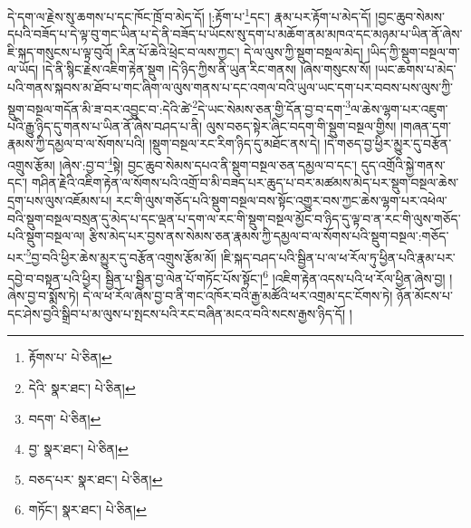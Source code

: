 དེ་དག་ལ་རྗེས་སུ་ཆགས་པ་དང་ཁོང་ཁྲོ་བ་མེད་དོ། །:རྟོག་པ་\footnote{རྟོགས་པ་  པེ་ཅིན། }དང་། རྣམ་པར་རྟོག་པ་མེད་དོ། །བྱང་ཆུབ་སེམས་དཔའི་བཟོད་པ་དེ་ལྟ་བུ་གང་ཡིན་པ་དེ་ནི་བཟོད་པ་ཡོངས་སུ་དག་པ་མཆོག་ནམ་མཁའ་དང་མཉམ་པ་ཡིན་ནོ་ཞེས་ཇི་སྐད་གསུངས་པ་ལྟ་བུའོ། །རིན་པོ་ཆེའི་ཕྲེང་བ་ལས་ཀྱང་། དེ་ལ་ལུས་ཀྱི་སྡུག་བསྔལ་མེད། །ཡིད་ཀྱི་སྡུག་བསྔལ་ག་ལ་ཡོད། །དེ་ནི་སྙིང་རྗེས་འཇིག་རྟེན་སྡུག །དེ་ཉིད་ཀྱིས་ནི་ཡུན་རིང་གནས། །ཞེས་གསུངས་སོ། །ཡང་ཆགས་པ་མེད་པའི་གནས་སྐབས་མ་ཐོབ་པ་གང་ཞིག་ལ་ལུས་གནས་པ་དང་འགལ་བའི་ཡུལ་ཡང་དག་པར་བབས་པས་ལུས་ཀྱི་སྡུག་བསྔལ་གདོན་མི་ཟ་བར་འབྱུང་བ་:དེའི་ཚེ་\footnote{དེའི་  སྣར་ཐང་།  པེ་ཅིན། }དེ་ཡང་སེམས་ཅན་གྱི་དོན་བྱ་བ་དག་\footnote{བདག་  པེ་ཅིན། }ལ་ཆེས་ལྷག་པར་འཇུག་པའི་རྒྱུ་ཉིད་དུ་གནས་པ་ཡིན་ནོ་ཞེས་བཤད་པ་ནི། ལུས་བཅད་སྟེར་ཞིང་བདག་གི་སྡུག་བསྔལ་གྱིས། །གཞན་དག་རྣམས་ཀྱི་དམྱལ་བ་ལ་སོགས་པའི། །སྡུག་བསྔལ་རང་རིག་ཉིད་དུ་མཐོང་ནས་དེ། །དེ་གཅད་བྱ་ཕྱིར་མྱུར་དུ་བརྩོན་འགྲུས་རྩོམ། །ཞེས་:བྱ་བ་\footnote{བྱ་  སྣར་ཐང་།  པེ་ཅིན། }སྟེ། བྱང་ཆུབ་སེམས་དཔའ་ནི་སྡུག་བསྔལ་ཅན་དམྱལ་བ་དང་། དུད་འགྲོའི་སྐྱེ་གནས་དང་། གཤིན་རྗེའི་འཇིག་རྟེན་ལ་སོགས་པའི་འགྲོ་བ་མི་བཟད་པར་ཆུད་པ་བར་མཚམས་མེད་པར་སྡུག་བསྔལ་ཆེས་དྲག་པས་ལུས་འཇོམས་པ། རང་གི་ལུས་གཅོད་པའི་སྡུག་བསྔལ་བས་སྟོང་འགྱུར་བས་ཀྱང་ཆེས་ལྷག་པར་འཕེལ་བའི་སྡུག་བསྔལ་བསྲན་དུ་མེད་པ་དང་ལྡན་པ་དག་ལ་རང་གི་སྡུག་བསྔལ་མྱོང་བ་ཉིད་དུ་ལྟ་བ་ན་རང་གི་ལུས་གཅོད་པའི་སྡུག་བསྔལ་ལ། རྩིས་མེད་པར་བྱས་ནས་སེམས་ཅན་རྣམས་ཀྱི་དམྱལ་བ་ལ་སོགས་པའི་སྡུག་བསྔལ་:གཅོད་པར་\footnote{བཅད་པར་  སྣར་ཐང་།  པེ་ཅིན། }བྱ་བའི་ཕྱིར་ཆེས་མྱུར་དུ་བརྩོན་འགྲུས་རྩོམ་མོ། །ཇི་སྐད་བཤད་པའི་སྦྱིན་པ་ལ་ཕ་རོལ་ཏུ་ཕྱིན་པའི་རྣམ་པར་དབྱེ་བ་བསྟན་པའི་ཕྱིར། སྦྱིན་པ་སྦྱིན་བྱ་ལེན་པོ་གཏོང་པོས་སྟོང་།\footnote{གཏོང་།  སྣར་ཐང་།  པེ་ཅིན། } །འཇིག་རྟེན་འདས་པའི་ཕ་རོལ་ཕྱིན་ཞེས་བྱ། །ཞེས་བྱ་བ་སྨོས་ཏེ། དེ་ལ་ཕ་རོལ་ཞེས་བྱ་བ་ནི་གང་འཁོར་བའི་རྒྱ་མཚོའི་ཕར་འགྲམ་དང་ངོགས་ཏེ། ཉོན་མོངས་པ་དང་ཤེས་བྱའི་སྒྲིབ་པ་མ་ལུས་པ་སྤངས་པའི་རང་བཞིན་མངའ་བའི་སངས་རྒྱས་ཉིད་དོ། །
